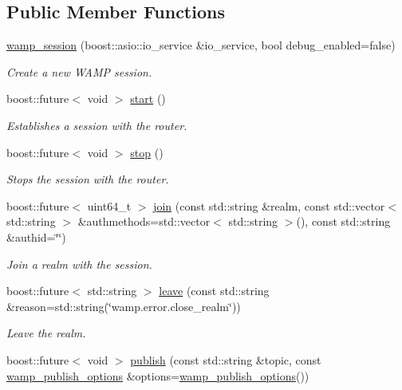 \subsection*{Public Member Functions}
\begin{DoxyCompactItemize}
\item 
\hyperlink{classautobahn_1_1wamp__session_a0693ad91bf2fe2952044979ad6d32ec4}{wamp\+\_\+session} (boost\+::asio\+::io\+\_\+service \&io\+\_\+service, bool debug\+\_\+enabled=false)
\begin{DoxyCompactList}\small\item\em Create a new W\+A\+MP session. \end{DoxyCompactList}\item 
boost\+::future$<$ void $>$ \hyperlink{classautobahn_1_1wamp__session_a50e587da630e209858a70ae342ee1fec}{start} ()
\begin{DoxyCompactList}\small\item\em Establishes a session with the router. \end{DoxyCompactList}\item 
boost\+::future$<$ void $>$ \hyperlink{classautobahn_1_1wamp__session_a735e96fa6dd856a0ffb03161ff1ca262}{stop} ()
\begin{DoxyCompactList}\small\item\em Stops the session with the router. \end{DoxyCompactList}\item 
boost\+::future$<$ uint64\+\_\+t $>$ \hyperlink{classautobahn_1_1wamp__session_aec0bc6ef02837fa3daaba07d9f053368}{join} (const std\+::string \&realm, const std\+::vector$<$ std\+::string $>$ \&authmethods=std\+::vector$<$ std\+::string $>$(), const std\+::string \&authid=\char`\"{}\char`\"{})
\begin{DoxyCompactList}\small\item\em Join a realm with the session. \end{DoxyCompactList}\item 
boost\+::future$<$ std\+::string $>$ \hyperlink{classautobahn_1_1wamp__session_a499c1a7f1e7c3a9da71cc1ec82521dfa}{leave} (const std\+::string \&reason=std\+::string(\char`\"{}wamp.\+error.\+close\+\_\+realm\char`\"{}))
\begin{DoxyCompactList}\small\item\em Leave the realm. \end{DoxyCompactList}\item 
boost\+::future$<$ void $>$ \hyperlink{classautobahn_1_1wamp__session_a404fcf00db6996043d66a36c38fbd9e7}{publish} (const std\+::string \&topic, const \hyperlink{classautobahn_1_1wamp__publish__options}{wamp\+\_\+publish\+\_\+options} \&options=\hyperlink{classautobahn_1_1wamp__publish__options}{wamp\+\_\+publish\+\_\+options}())

\end{DoxyCompactItemize}
